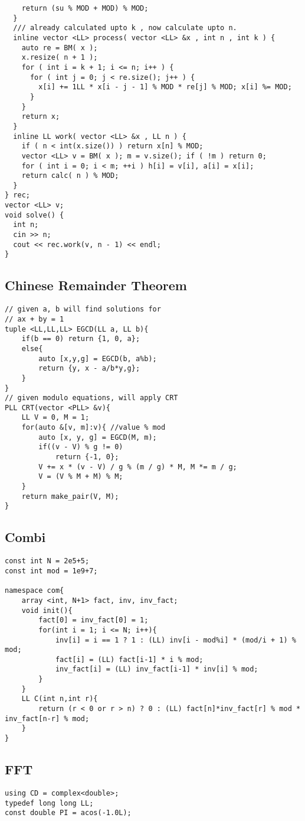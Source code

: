 \documentclass[FSZ,a4paper,onesided]{article}
\begin{document}
\begin{multicols*}{\COLS}
\begin{lstlisting}
    return (su % MOD + MOD) % MOD;
  }
  /// already calculated upto k , now calculate upto n.
  inline vector <LL> process( vector <LL> &x , int n , int k ) {
    auto re = BM( x );
    x.resize( n + 1 );
    for ( int i = k + 1; i <= n; i++ ) {
      for ( int j = 0; j < re.size(); j++ ) {
        x[i] += 1LL * x[i - j - 1] % MOD * re[j] % MOD; x[i] %= MOD;
      }
    }
    return x;
  }
  inline LL work( vector <LL> &x , LL n ) {
    if ( n < int(x.size()) ) return x[n] % MOD;
    vector <LL> v = BM( x ); m = v.size(); if ( !m ) return 0;
    for ( int i = 0; i < m; ++i ) h[i] = v[i], a[i] = x[i];
    return calc( n ) % MOD;
  }
} rec;
vector <LL> v;
void solve() {
  int n;
  cin >> n;
  cout << rec.work(v, n - 1) << endl;
}

\end{lstlisting}
\subsection{Chinese Remainder Theorem}
\begin{lstlisting}
// given a, b will find solutions for
// ax + by = 1
tuple <LL,LL,LL> EGCD(LL a, LL b){
    if(b == 0) return {1, 0, a};
    else{
        auto [x,y,g] = EGCD(b, a%b);
        return {y, x - a/b*y,g};
    }
}
// given modulo equations, will apply CRT
PLL CRT(vector <PLL> &v){
    LL V = 0, M = 1;
    for(auto &[v, m]:v){ //value % mod
        auto [x, y, g] = EGCD(M, m);
        if((v - V) % g != 0)
            return {-1, 0};
        V += x * (v - V) / g % (m / g) * M, M *= m / g;
        V = (V % M + M) % M;
    }
    return make_pair(V, M);
}
\end{lstlisting}
\subsection{Combi}
\begin{lstlisting}
const int N = 2e5+5;
const int mod = 1e9+7;

namespace com{
    array <int, N+1> fact, inv, inv_fact;
    void init(){
        fact[0] = inv_fact[0] = 1;
        for(int i = 1; i <= N; i++){
            inv[i] = i == 1 ? 1 : (LL) inv[i - mod%i] * (mod/i + 1) % mod;
            fact[i] = (LL) fact[i-1] * i % mod;
            inv_fact[i] = (LL) inv_fact[i-1] * inv[i] % mod;
        }
    }
    LL C(int n,int r){
        return (r < 0 or r > n) ? 0 : (LL) fact[n]*inv_fact[r] % mod * inv_fact[n-r] % mod;
    }
}
\end{lstlisting}
\subsection{FFT}
\begin{lstlisting}
using CD = complex<double>;
typedef long long LL;
const double PI = acos(-1.0L);


\end{lstlisting}
\end{multicols*}
\end{document}
